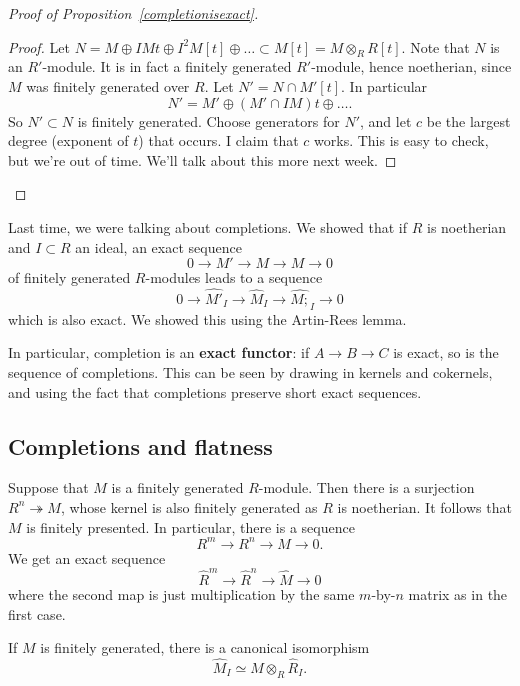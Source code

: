 \begin{proof}[Proof of Proposition~\ref{completionisexact}]
\begin{proof}
Let $N = M \oplus  IM t \oplus I^2 M [t] \oplus \dots \subset M[t] = M
\otimes_R R[t]$. Note that $N$ is an $R'$-module. It is in fact a finitely
generated $R'$-module, hence noetherian, since $M$ was finitely generated over
$R$. Let $N' = N \cap M'[t]$. In particular
\[ N' = M' \oplus (M' \cap IM ) t \oplus \dots.  \]
So $N' \subset N$ is finitely generated. Choose generators for $N'$, and let
$c$ be the largest degree (exponent of $t$) that occurs.
I claim that $c$ works.  This is easy to check, but we're out of time. We'll
talk about this more next week. 
\end{proof} 
\end{proof} 

Last time, we were talking about completions. We showed that if $R$ is
noetherian and $I \subset R$ an ideal, an exact sequence
\[ 0 \to M' \to M \to M \to 0   \]
of finitely generated $R$-modules leads to a sequence
\[ 0 \to \hat{M'}_I \to \hat{M}_I \to \hat{M;}_I \to 0  \]
which is also exact. We showed this using the Artin-Rees lemma.

\begin{remark}
In particular, completion is an \textbf{exact functor}: if $A \to B \to C$ is
exact, so is the sequence of completions. This can be seen by drawing in
kernels and cokernels, and using the fact that completions preserve short
exact sequences. 
\end{remark}

\subsection{Completions and flatness}

Suppose that $M$ is a finitely generated $R$-module. Then there is a surjection $R^n
\twoheadrightarrow M$, whose kernel is also finitely generated as $R$ is
noetherian. It follows that
$M$ is finitely presented. In particular, there is a sequence
\[ R^m \to R^n \to M \to 0.  \]
We get an exact sequence
\[ \hat{R}^m \to \hat{R}^n \to \hat{M} \to 0  \]
where the second map is just multiplication by the same $m$-by-$n$ matrix as in
the first case.

\begin{corollary} 
If $M$ is finitely generated, there is a canonical isomorphism
\[ \hat{M}_I \simeq M \otimes_R \hat{R}_I.  \]
\end{corollary} 

